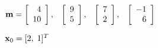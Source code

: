 \documentclass{article}
\def\lthtmlcheckvsize{\ifdim\ht\sizebox<\vsize 
  \ifdim\wd\sizebox<\hsize\expandafter\hfill\fi \expandafter\vfill
  \else\expandafter\vss\fi}%
\begin{document}
{\newpage\clearpage
{}%
$\displaystyle {\bf m}=\left[\begin{array}{r}4\\10\end{array}\right],\;\;\;
\left[\begin{array}{r}9\\5\end{array}\right],\;\;\;
\left[\begin{array}{r}7\\2\end{array}\right],\;\;\;
\left[\begin{array}{r}-1\\6\end{array}\right]$%
\lthtmlindisplaymathZ
\lthtmlcheckvsize\clearpage}

{\newpage\clearpage
{}%
$ {\bf x}_0=[2,\;1]^T$%
\lthtmlindisplaymathZ
\lthtmlcheckvsize\clearpage}
\end{document}
